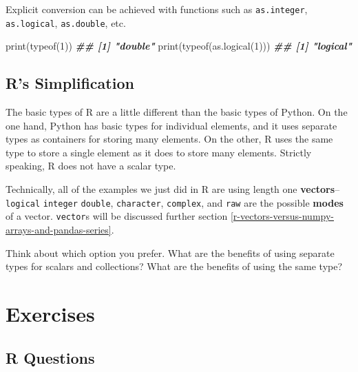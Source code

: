 \documentclass[
  12pt,
  krantz2]{krantz}
\makeatletter
\newenvironment{Shaded}{\begin{snugshade}}{\end{snugshade}}
\newcommand{\DecValTok}[1]{\textcolor[rgb]{0.06,0.06,0.06}{#1}}
\newcommand{\DocumentationTok}[1]{\textcolor[rgb]{0.37,0.37,0.37}{\textbf{\textit{#1}}}}
\newcommand{\FunctionTok}[1]{\textcolor[rgb]{0,0,0}{#1}}
\newcommand{\NormalTok}[1]{#1}
\newenvironment{kframe}{%
\medskip{}
\setlength{\fboxsep}{.8em}
 \def\at@end@of@kframe{}%
 \ifinner\ifhmode%
  \def\at@end@of@kframe{\end{minipage}}%
  \begin{minipage}{\columnwidth}%
 \fi\fi%
 \def\FrameCommand##1{\hskip\@totalleftmargin \hskip-\fboxsep
 \colorbox{shadecolor}{##1}\hskip-\fboxsep
     \hskip-\linewidth \hskip-\@totalleftmargin \hskip\columnwidth}%
 \MakeFramed {\advance\hsize-\width
   \@totalleftmargin\z@ \linewidth\hsize
   \@setminipage}}%
 {\par\unskip\endMakeFramed%
 \at@end@of@kframe}
\renewenvironment{Shaded}{\begin{kframe}}{\end{kframe}}
\makeatother
\begin{document}
Explicit conversion can be achieved with functions such as \texttt{as.integer}, \texttt{as.logical}, \texttt{as.double}, etc.

\begin{Shaded}
\begin{Highlighting}[]
\FunctionTok{print}\NormalTok{(}\FunctionTok{typeof}\NormalTok{(}\DecValTok{1}\NormalTok{))}
\DocumentationTok{\#\# [1] "double"}
\FunctionTok{print}\NormalTok{(}\FunctionTok{typeof}\NormalTok{(}\FunctionTok{as.logical}\NormalTok{(}\DecValTok{1}\NormalTok{)))}
\DocumentationTok{\#\# [1] "logical"}
\end{Highlighting}
\end{Shaded}

\hypertarget{rs-simplification}{%
\subsection{R's Simplification}\label{rs-simplification}}

The basic types of R are a little different than the basic types of Python. On the one hand, Python has basic types for individual elements, and it uses separate types as containers for storing many elements. On the other, R uses the same type to store a single element as it does to store many elements. Strictly speaking, R does not have a scalar type.

Technically, all of the examples we just did in R are using length one \textbf{vectors}--\texttt{logical} \texttt{integer} \texttt{double}, \texttt{character}, \texttt{complex}, and \texttt{raw} are the possible \textbf{modes} of a vector. \texttt{vector}s will be discussed further section \ref{r-vectors-versus-numpy-arrays-and-pandas-series}.

Think about which option you prefer. What are the benefits of using separate types for scalars and collections? What are the benefits of using the same type?

\hypertarget{exercises}{%
\section{Exercises}\label{exercises}}

\hypertarget{r-questions}{%
\subsection{R Questions}\label{r-questions}}
\end{document}
